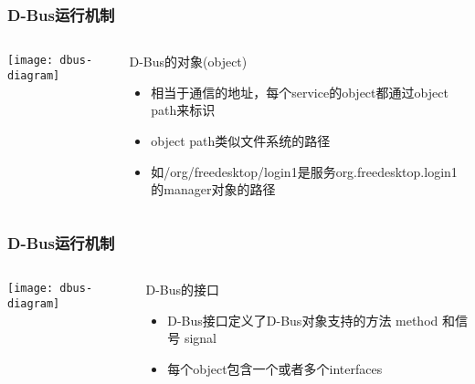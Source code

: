 \begin{frame}[fragile]
	\frametitle{D-Bus运行机制}
	
	\begin{columns}
		\begin{column}{.4\textwidth}
			
			\texttt{[image: dbus-diagram]}
			
		\end{column}
		\begin{column}{.6\textwidth}
			D-Bus的对象(object)
			\begin{itemize}
				\item 相当于通信的地址，每个service的object都通过object path来标识
				\item object path类似文件系统的路径
				\item 如/org/freedesktop/login1是服务org.freedesktop.login1的manager对象的路径
				
			\end{itemize}
		\end{column}
	\end{columns}
\end{frame}

\begin{frame}[fragile]
	\frametitle{D-Bus运行机制}
	
	\begin{columns}
		\begin{column}{.4\textwidth}
			
			\texttt{[image: dbus-diagram]}
			
		\end{column}
		\begin{column}{.6\textwidth}
			D-Bus的接口
			\begin{itemize}
				\item D-Bus接口定义了D-Bus对象支持的方法 method 和信号 signal
				\item 每个object包含一个或者多个interfaces				
			\end{itemize}
		\end{column}
	\end{columns}
\end{frame}


